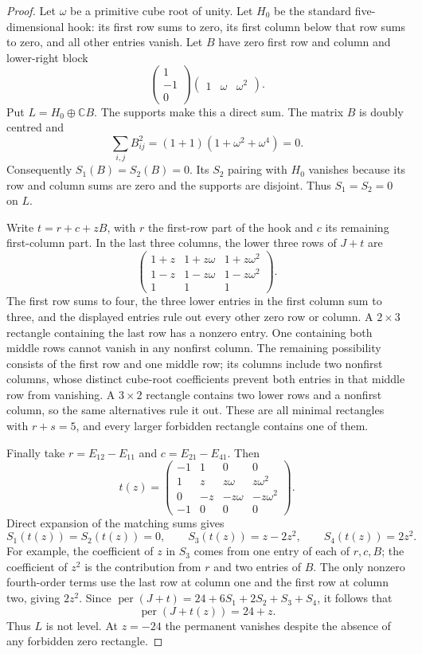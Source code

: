 \begin{proof}
Let $\omega$ be a primitive cube root of unity.  Let $H_0$ be the standard
five-dimensional hook: its first row sums to zero, its first column below that
row sums to zero, and all other entries vanish.  Let $B$ have zero first row and
column and lower-right block
\[
 \begin{pmatrix}1\\-1\\0\end{pmatrix}
 \begin{pmatrix}1&\omega&\omega^2\end{pmatrix}.
\]
Put $L=H_0\oplus\mathbb C B$.  The supports make this a direct sum.  The matrix
$B$ is doubly centred and
\[
 \sum_{i,j}B_{ij}^2=(1+1)(1+\omega^2+\omega^4)=0.
\]
Consequently $S_1(B)=S_2(B)=0$.  Its $S_2$ pairing with $H_0$ vanishes because
its row and column sums are zero and the supports are disjoint.  Thus
$S_1=S_2=0$ on $L$.

Write $t=r+c+zB$, with $r$ the first-row part of the hook and $c$ its remaining
first-column part.  In the last three columns, the lower three rows of $J+t$ are
\[
 \begin{pmatrix}
  1+z&1+z\omega&1+z\omega^2\\
  1-z&1-z\omega&1-z\omega^2\\
  1&1&1
 \end{pmatrix}.
\]
The first row sums to four, the three lower entries in the first column sum to
three, and the displayed entries rule out every other zero row or column.
A $2\times3$ rectangle containing the last row has a nonzero entry.  One
containing both middle rows cannot vanish in any nonfirst column.  The remaining
possibility consists of the first row and one middle row; its columns include
two nonfirst columns, whose distinct cube-root coefficients prevent both entries
in that middle row from vanishing.  A $3\times2$ rectangle contains two lower
rows and a nonfirst column, so the same alternatives rule it out.  These are all
minimal rectangles with $r+s=5$, and every larger forbidden rectangle contains
one of them.

Finally take $r=E_{12}-E_{11}$ and $c=E_{21}-E_{41}$.  Then
\[
 t(z)=\begin{pmatrix}
 -1&1&0&0\\
 1&z&z\omega&z\omega^2\\
 0&-z&-z\omega&-z\omega^2\\
 -1&0&0&0
 \end{pmatrix}.
\]
Direct expansion of the matching sums gives
\[
 S_1(t(z))=S_2(t(z))=0,\qquad
 S_3(t(z))=z-2z^2,\qquad S_4(t(z))=2z^2.
\]
For example, the coefficient of $z$ in $S_3$ comes from one entry of each of
$r,c,B$; the coefficient of $z^2$ is the contribution from $r$ and two entries
of $B$.  The only nonzero fourth-order terms use the last row at column one
and the first row at column two, giving $2z^2$.  Since
$\operatorname{per}(J+t)=24+6S_1+2S_2+S_3+S_4$, it follows that
\[
 \operatorname{per}(J+t(z))=24+z.
\]
Thus $L$ is not level.  At $z=-24$ the permanent vanishes despite the absence of
any forbidden zero rectangle.
\end{proof}

